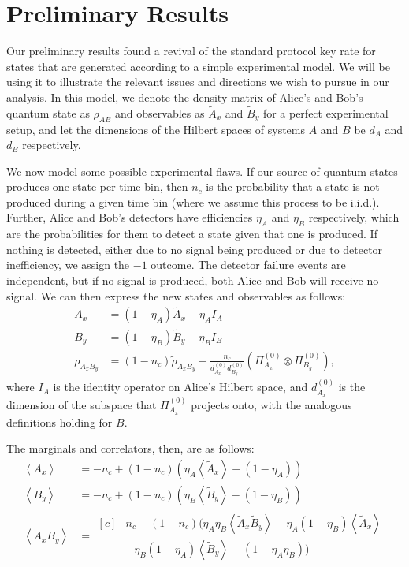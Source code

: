 \documentclass[10pt, a4paper]{article}
\numberwithin{equation}{section} %
\theoremstyle{definition}
\theoremstyle{plain}
\newcommand{\?}{\mathrel{?}} %
\newcommand{\angleb}[1]{\left\langle #1 \right\rangle} %
\begin{document}
    \section{Preliminary Results}\label{sec:preres}

    Our preliminary results found a revival of the standard protocol key rate for states that are generated according to a simple experimental model. We will be using it to illustrate the relevant issues and directions we wish to pursue in our analysis. In this model, we denote the density matrix of Alice's and Bob's quantum state as \(\rho_{AB}\) and observables as \(\tilde{A}_x\) and \(\tilde{B}_y\) for a perfect experimental setup, and let the dimensions of the Hilbert spaces of systems \(A\) and \(B\) be \(d_A\) and \(d_B\) respectively.

    We now model some possible experimental flaws. If our source of quantum states produces one state per time bin, then \(n_c\) is the probability that a state is not produced during a given time bin (where we assume this process to be i.i.d.). Further, Alice and Bob's detectors have efficiencies \(\eta_A\) and \(\eta_B\) respectively, which are the probabilities for them to detect a state given that one is produced. If nothing is detected, either due to no signal being produced or due to detector inefficiency, we assign the \(-1\) outcome. The detector failure events are independent, but if no signal is produced, both Alice and Bob will receive no signal. We can then express the new states and observables as follows:
    \begin{align*}
      A_x &= (1-\eta_A)\tilde{A}_x - \eta_A I_A \\
      B_y &= (1-\eta_B)\tilde{B}_y - \eta_B I_B \\
      \rho_{{A_x}{B_y}} &= (1-n_c)\tilde{\rho}_{{A_x}{B_y}} + \frac{n_c}{d^{(0)}_{A_x} d^{(0)}_{B_y}} \left( \Pi_{A_x}^{(0)} \otimes \Pi_{B_y}^{(0)} \right),
    \end{align*}
    where \(I_A\) is the identity operator on Alice's Hilbert space, and \(d^{(0)}_{A_x}\) is the dimension of the subspace that \(\Pi_{A_x}^{(0)}\) projects onto, with the analogous definitions holding for \(B\).

    The marginals and correlators, then, are as follows:
    \begin{align*}
      \angleb{A_x} &= -n_c + (1-n_c)(\eta_A\angleb{\tilde{A}_x} - (1-\eta_A)) \\
      \angleb{B_y} &= -n_c + (1-n_c)(\eta_B\angleb{\tilde{B}_y} - (1-\eta_B)) \\
      \angleb{A_x B_y} &= \begin{aligned}[c]
      & n_c + (1-n_c)(\eta_A\eta_B\angleb{\tilde{A}_x\tilde{B}_y} - \eta_A(1-\eta_B)\angleb{\tilde{A}_x} \\
      & -\eta_B(1-\eta_A)\angleb{\tilde{B}_y} + (1-\eta_A\eta_B) )
      \end{aligned}
      \end{align*}
\end{document}
